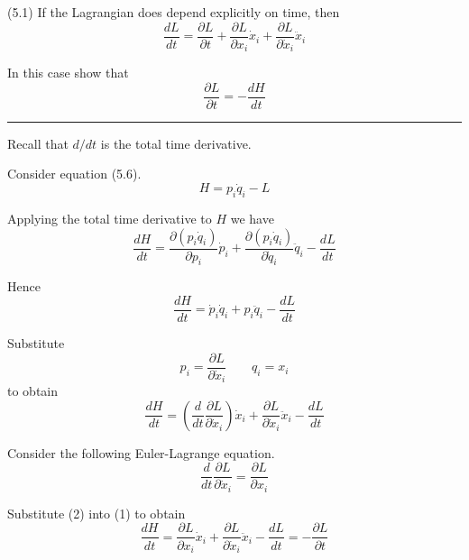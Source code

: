 \documentclass[12pt]{article}
\begin{document}
(5.1)
If the Lagrangian does depend explicitly on time,
then
\begin{equation*}
\frac{dL}{dt}=\frac{\partial L}{\partial t}
+\frac{\partial L}{\partial x_i}\dot x_i
+\frac{\partial L}{\partial\dot x_i}\ddot x_i
\tag{5.57}
\end{equation*}

In this case show that
\begin{equation*}
\frac{\partial L}{\partial t}=-\frac{dH}{dt}
\tag{5.58}
\end{equation*}

\bigskip
\hrule

\bigskip
Recall that $d/dt$ is the total time derivative.

\bigskip
Consider equation (5.6).
\begin{equation*}
H=p_i\dot q_i-L
\tag{5.6}
\end{equation*}

Applying the total time derivative to $H$ we have
\begin{equation*}
\frac{dH}{dt}
=\frac{\partial(p_i\dot q_i)}{\partial p_i}\dot p_i
+\frac{\partial(p_i\dot q_i)}{\partial\dot q_i}\ddot q_i
-\frac{dL}{dt}
\end{equation*}

Hence
\begin{equation*}
\frac{dH}{dt}
=\dot p_i\dot q_i+p_i\ddot q_i
-\frac{dL}{dt}
\end{equation*}

Substitute
\begin{equation*}
p_i=\frac{\partial L}{\partial\dot x_i}
\qquad
q_i=x_i
\end{equation*}
to obtain
\begin{equation*}
\frac{dH}{dt}
=\left(\frac{d}{dt}\frac{\partial L}{\partial\dot x_i}\right)\dot x_i
+\frac{\partial L}{\partial\dot x_i}\ddot x_i
-\frac{dL}{dt}
\tag{1}
\end{equation*}

Consider the following Euler-Lagrange equation.
\begin{equation*}
\frac{d}{dt}\frac{\partial L}{\partial\dot x_i}=\frac{\partial L}{\partial x_i}
\tag{2}
\end{equation*}

Substitute (2) into (1) to obtain
\begin{equation*}
\frac{dH}{dt}
=\frac{\partial L}{\partial x_i}\dot x_i
+\frac{\partial L}{\partial\dot x_i}\ddot x_i
-\frac{dL}{dt}
=-\frac{\partial L}{\partial t}
\end{equation*}
\end{document}
